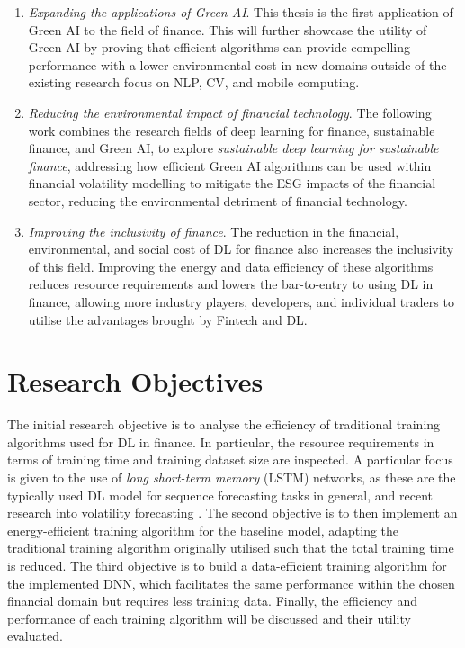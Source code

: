 \documentclass[a4paper, 11pt]{report}
\begin{document}
    \begin{enumerate}
        \item \emph{Expanding the applications of Green AI}. This thesis is the first application of Green AI to the field of finance. This will further showcase the utility of Green AI by proving that efficient algorithms can provide compelling performance with a lower environmental cost in new domains outside of the existing research focus on NLP, CV, and mobile computing.
        \item \emph{Reducing the environmental impact of financial technology}. The following work combines the research fields of deep learning for finance, sustainable finance, and Green AI, to explore \emph{sustainable deep learning for sustainable finance}, addressing how efficient Green AI algorithms can be used within financial volatility modelling to mitigate the ESG impacts of the financial sector, reducing the environmental detriment of financial technology.
        \item \emph{Improving the inclusivity of finance}. The reduction in the financial, environmental, and social cost of DL for finance also increases the inclusivity of this field. Improving the energy and data efficiency of these algorithms reduces resource requirements and lowers the bar-to-entry to using DL in finance, allowing more industry players, developers, and individual traders to utilise the advantages brought by Fintech and DL.
    \end{enumerate}


    \section{Research Objectives}

    The initial research objective is to analyse the efficiency of traditional training algorithms used for DL in finance. In particular, the resource requirements in terms of training time and training dataset size are inspected. A particular focus is given to the use of \emph{long short-term memory} (LSTM) networks, as these are the typically used DL model for sequence forecasting tasks in general, and recent research into volatility forecasting \citep{xiong-2015}. The second objective is to then implement an energy-efficient training algorithm for the baseline model, adapting the traditional training algorithm originally utilised such that the total training time is reduced. The third objective is to build a data-efficient training algorithm for the implemented DNN, which facilitates the same performance within the chosen financial domain but requires less training data. Finally, the efficiency and performance of each training algorithm will be discussed and their utility evaluated.
\end{document}
